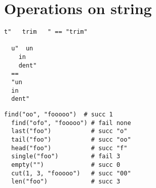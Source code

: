 \chapter{Operations on string}

\begin{example}
\begin{lstlisting}[language=intentio]
  t"   trim   " == "trim"

  u"  un
    in
    dent"
  ==
  "un
  in
  dent"
\end{lstlisting}
\end{example}

\begin{example}
\begin{lstlisting}[language=intentio]
  find("oo", "fooooo")  # succ 1
  find("ofo", "fooooo") # fail none
  last("foo")           # succ "o"
  tail("foo")           # succ "oo"
  head("foo")           # succ "f"
  single("foo")         # fail 3
  empty("")             # succ 0
  cut(1, 3, "fooooo")   # succ "00"
  len("foo")            # succ 3
\end{lstlisting}
\end{example}

